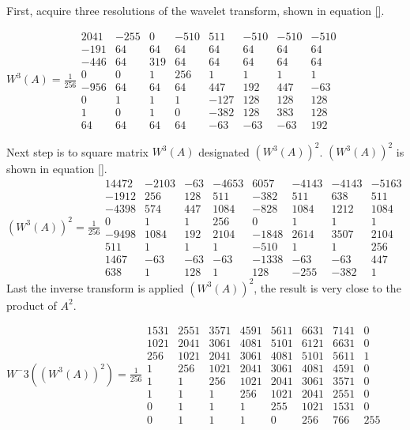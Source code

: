 \documentclass{article}
\begin{document}
First, acquire three resolutions of the wavelet transform, shown in equation \ref{}.

$
W^3(A)= \frac{1}{256}
\begin{array}{cccccccc}
2041 & -255 & 0 & -510 & 511 & -510 & -510 & -510\\
-191 & 64 & 64 & 64 & 64 & 64 & 64 & 64\\
-446 & 64 & 319 & 64 & 64 & 64 & 64 & 64\\
0 & 0 & 1 & 256 & 1 & 1 & 1 & 1\\
-956 & 64 & 64 & 64 & 447 & 192 & 447 & -63\\
0 & 1 & 1 & 1 & -127 & 128 & 128 & 128\\
1 & 0 & 1 & 0 & -382 & 128 & 383 & 128\\
64 & 64 & 64 & 64 & -63 & -63 & -63 & 192
\end{array}
$

Next step is to square matrix $W^3(A)$ designated $(W^3(A))^2$.  $(W^3(A))^2$ is shown in equation \ref{}.
$
(W^3(A))^2= \frac{1}{256}
\begin{array}{cccccccc}
14472 & -2103 & -63 & -4653 & 6057 & -4143 & -4143 & -5163\\
-1912 & 256 & 128 & 511 & -382 & 511 & 638 & 511\\
-4398 & 574 & 447 & 1084 & -828 & 1084 & 1212 & 1084\\
0 & 1 & 1 & 256 & 0 & 1 & 1 & 1\\
-9498 & 1084 & 192 & 2104 & -1848 & 2614 & 3507 & 2104\\
511 & 1 & 1 & 1 & -510 & 1 & 1 & 256\\
1467 & -63 & -63 & -63 & -1338 & -63 & -63 & 447\\
638 & 1 & 128 & 1 & 128 & -255 & -382 & 1
\end{array}
$ 
Last the inverse transform is applied $(W^3(A))^2$, the result is very close to the product of $A^2$.

$
W^-3((W^3(A))^2)= \frac{1}{256}
\begin{array}{cccccccc}
1531 & 2551 & 3571 & 4591 & 5611 & 6631 & 7141 & 0\\
1021 & 2041 & 3061 & 4081 & 5101 & 6121 & 6631 & 0\\
256 & 1021 & 2041 & 3061 & 4081 & 5101 & 5611 & 1\\
1 & 256 & 1021 & 2041 & 3061 & 4081 & 4591 & 0\\
1 & 1 & 256 & 1021 & 2041 & 3061 & 3571 & 0\\
1 & 1 & 1 & 256 & 1021 & 2041 & 2551 & 0\\
0 & 1 & 1 & 1 & 255 & 1021 & 1531 & 0\\
0 & 1 & 1 & 1 & 0 & 256 & 766 & 255
\end{array}
$
\end{document}

